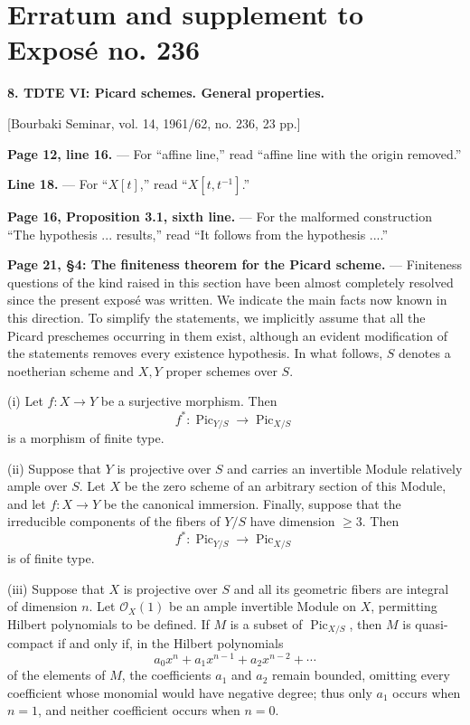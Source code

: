 \clearpage
\chapter*{Erratum and supplement to Exposé no. 236}

\noindent\textbf{8. TDTE VI: Picard schemes. General properties.}

\begin{center}
[Bourbaki Seminar, vol. 14, 1961/62, no. 236, 23 pp.]
\end{center}

\noindent\textbf{Page 12, line 16.} --- For “affine line,” read “affine line
with the origin removed.”

\noindent\textbf{Line 18.} --- For “$X[t]$,” read “$X[t,t^{-1}]$.”

\noindent\textbf{Page 16, Proposition 3.1, sixth line.} --- For the malformed
construction “The hypothesis ... results,” read “It follows from the
hypothesis ....”

\noindent\textbf{Page 21, §4: The finiteness theorem for the Picard scheme.}
--- Finiteness questions of the kind raised in this section have been almost
completely resolved since the present exposé was written. We indicate the main
facts now known in this direction. To simplify the statements, we implicitly
assume that all the Picard preschemes occurring in them exist, although an
evident modification of the statements removes every existence hypothesis.
In what follows, $S$ denotes a noetherian scheme and $X,Y$ proper schemes over
$S$.

\medskip
\noindent(i) Let $f:X\longrightarrow Y$ be a surjective morphism. Then
\[
f^*: \operatorname{Pic}_{Y/S}\longrightarrow\operatorname{Pic}_{X/S}
\]
is a morphism of finite type.

\noindent(ii) Suppose that $Y$ is projective over $S$ and carries an invertible
Module relatively ample over $S$. Let $X$ be the zero scheme of an arbitrary
section of this Module, and let $f:X\longrightarrow Y$ be the canonical
immersion. Finally, suppose that the irreducible components of the fibers of
$Y/S$ have dimension $\geq3$. Then
\[
f^*: \operatorname{Pic}_{Y/S}\longrightarrow\operatorname{Pic}_{X/S}
\]
is of finite type.

\noindent(iii) Suppose that $X$ is projective over $S$ and all its geometric
fibers are integral of dimension $n$. Let $\mathcal O_X(1)$ be an ample
invertible Module on $X$, permitting Hilbert polynomials to be defined. If $M$
is a subset of $\operatorname{Pic}_{X/S}$, then $M$ is quasi-compact if and
only if, in the Hilbert polynomials
\[
a_0x^n+a_1x^{n-1}+a_2x^{n-2}+\cdots
\]
of the elements of $M$, the coefficients $a_1$ and $a_2$ remain bounded, omitting every coefficient whose monomial would have negative degree; thus only $a_1$ occurs when $n=1$, and neither coefficient occurs when $n=0$.

